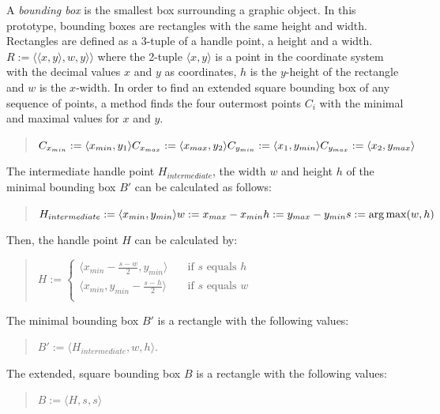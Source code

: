 A \emph{bounding box} is the smallest box surrounding a graphic object.
In this prototype, bounding boxes are rectangles with the same height and width.
Rectangles are defined as a 3-tuple of a handle point, a height and a width.
\(R:= \langle \langle x,y \rangle , w, y \rangle \rangle \) where the 2-tuple \(\langle x,y \rangle \) is a point in the coordinate
system with the decimal values \(x\) and \(y\) as coordinates, 
\(h\) is the \(y\)-height of the rectangle and \(w\) is the \(x\)-width.
In order to find an extended square bounding box of any sequence of points,
a method finds the four outermost points \(C_i\) with the minimal and maximal 
values for \(x\) and \(y\). 
\begin{quote}
\(
  C_{x_{min}} := \langle x_{min}, y_1 \rangle \\
  C_{x_{max}} := \langle x_{max}, y_2 \rangle  \\
  C_{y_{min}} := \langle x_1, y_{min} \rangle  \\
  C_{y_{max}} := \langle x_2, y_{max} \rangle  
\)
\end{quote}
The intermediate handle point \(H_{intermediate}\), the width \(w\) and 
height \(h\) of the minimal bounding box \(B'\) can be calculated as follows: 
\begin{quote}
\(
  H_{intermediate} := \langle x_{min}, y_{min} \rangle   \\
  w := x_{max} - x_{min} \\
  h := y_{max} - y_{min} \\
  s := \operatorname{arg\,max}(w,h)
\)
\end{quote}
Then, the handle point \(H\) can be calculated by:
\begin{quote}
\(
  H := 
  \begin{cases}
   \langle x_{min} - \frac{s-w}{2},y_{min} \rangle  & \quad \text{if $s$ equals $h$}\\
   \langle x_{min}, y_{min} - \frac{s-h}{2} \rangle  & \quad \text{if $s$ equals $w$}\\
  \end{cases}
\)
\end{quote}
The minimal bounding box \(B'\) is a rectangle with the following values:
\begin{quote}
  \(B' := \langle H_{intermediate}, w, h \rangle \).
\end{quote}
The extended, square bounding box \(B\) is a rectangle with the 
following values:
\begin{quote}
  \(B := \langle H, s, s \rangle \)
\end{quote}
